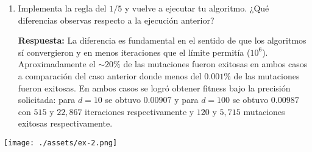\documentclass[10pt,letterpaper]{article}
\begin{document}
\begin{enumerate}
\begin{enumerate}
            \item Implementa la regla del $1/5$ y vuelve a ejecutar tu algoritmo. ¿Qué diferencias
            observas respecto a la ejecución anterior?

            \textbf{Respuesta:} La diferencia es fundamental en el sentido de que los algoritmos sí
            convergieron y en menos iteraciones que el límite permitía ($10^6$). Aproximadamente
            el $\sim 20\%$ de las mutaciones fueron exitosas en ambos casos a comparación del caso
            anterior donde menos del $0.001\%$ de las mutaciones fueron exitosas. En ambos casos se
            logró obtener fitness bajo la precisión solicitada: para $d=10$ se obtuvo $0.00907$ y para
            $d=100$ se obtuvo $0.00987$ con $515$ y $22,867$ iteraciones respectivamente y $120$ y $5,715$
            mutaciones exitosas respectivamente.
        \end{enumerate}

        \begin{center}
            \texttt{[image: ./assets/ex-2.png]}
        \end{center}
\end{enumerate}
\end{document}
